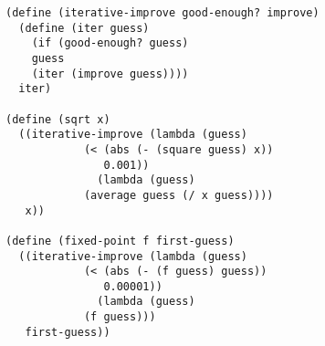 \documentclass[a4paper,12pt]{article}
\begin{document}
\begin{lstlisting}
(define (iterative-improve good-enough? improve)
  (define (iter guess)
    (if (good-enough? guess)
	guess
	(iter (improve guess))))
  iter)

(define (sqrt x)
  ((iterative-improve (lambda (guess)
			(< (abs (- (square guess) x))
			   0.001))
		      (lambda (guess)
			(average guess (/ x guess))))
   x))

(define (fixed-point f first-guess)
  ((iterative-improve (lambda (guess)
			(< (abs (- (f guess) guess))
			   0.00001))
		      (lambda (guess)
			(f guess)))
   first-guess))
\end{lstlisting}
\end{document}
